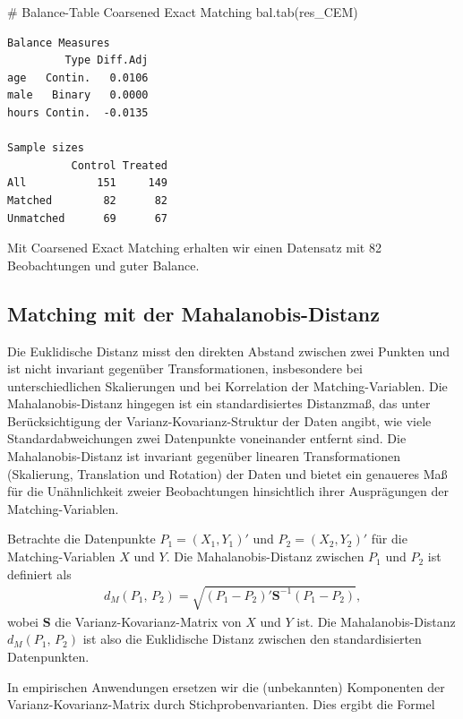 \documentclass[
  a4paper,
  DIV=11,
  oneside]{scrreprt}
\newenvironment{Shaded}{\begin{snugshade}}{\end{snugshade}}
\newcommand{\CommentTok}[1]{\textcolor[rgb]{0.37,0.37,0.37}{#1}}
\newcommand{\FunctionTok}[1]{\textcolor[rgb]{0.28,0.35,0.67}{#1}}
\newcommand{\NormalTok}[1]{\textcolor[rgb]{0.00,0.23,0.31}{#1}}
\begin{document}
\begin{Shaded}
\begin{Highlighting}[]
\CommentTok{\# Balance{-}Table Coarsened Exact Matching}
\FunctionTok{bal.tab}\NormalTok{(res\_CEM)}
\end{Highlighting}
\end{Shaded}

\begin{verbatim}
Balance Measures
         Type Diff.Adj
age   Contin.   0.0106
male   Binary   0.0000
hours Contin.  -0.0135

Sample sizes
          Control Treated
All           151     149
Matched        82      82
Unmatched      69      67
\end{verbatim}

Mit Coarsened Exact Matching erhalten wir einen Datensatz mit 82
Beobachtungen und guter Balance.

\subsection{Matching mit der
Mahalanobis-Distanz}\label{matching-mit-der-mahalanobis-distanz}

Die Euklidische Distanz misst den direkten Abstand zwischen zwei Punkten
und ist nicht invariant gegenüber Transformationen, insbesondere bei
unterschiedlichen Skalierungen und bei Korrelation der
Matching-Variablen. Die Mahalanobis-Distanz hingegen ist ein
standardisiertes Distanzmaß, das unter Berücksichtigung der
Varianz-Kovarianz-Struktur der Daten angibt, wie viele
Standardabweichungen zwei Datenpunkte voneinander entfernt sind. Die
Mahalanobis-Distanz ist invariant gegenüber linearen Transformationen
(Skalierung, Translation und Rotation) der Daten und bietet ein
genaueres Maß für die Unähnlichkeit zweier Beobachtungen hinsichtlich
ihrer Ausprägungen der Matching-Variablen.

Betrachte die Datenpunkte \(P_1=(X_1,Y_1)'\) und \(P_2=(X_2,Y_2)'\) für
die Matching-Variablen \(X\) und \(Y\). Die Mahalanobis-Distanz zwischen
\(P_1\) und \(P_2\) ist definiert als \begin{align*}
  d_M(P_1,\,P_2) = \sqrt{(P_1 - P_2)'\boldsymbol{S}^{-1} (P_1 - P_2)},
\end{align*} wobei \(\boldsymbol{S}\) die Varianz-Kovarianz-Matrix von
\(X\) und \(Y\) ist. Die Mahalanobis-Distanz \(d_M(P_1,\,P_2)\) ist also
die Euklidische Distanz zwischen den standardisierten Datenpunkten.

In empirischen Anwendungen ersetzen wir die (unbekannten) Komponenten
der Varianz-Kovarianz-Matrix durch Stichprobenvarianten. Dies ergibt die
Formel
\end{document}
